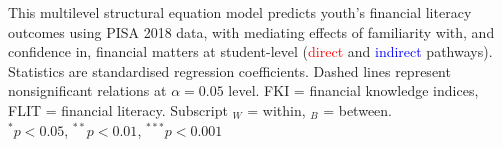 {
}{This multilevel structural equation model predicts youth's financial literacy outcomes using PISA 2018 data, with mediating effects of familiarity with, and confidence in, financial matters at student-level (\textcolor{red}{direct} and \textcolor{blue}{indirect} pathways). Statistics are standardised regression coefficients. Dashed lines represent nonsignificant relations at $\alpha=0.05$ level. FKI = financial knowledge indices, FLIT = financial literacy. Subscript $_W$ = within, $_B$ = between.\\
$^{*}p<0.05$, $^{**}p<0.01$, $^{***}p<0.001$}
